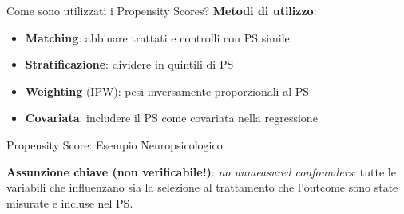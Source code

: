 \documentclass[
  ignorenonframetext,
]{beamer}
\begin{document}
\begin{frame}{Come sono utilizzati i Propensity Scores?}
\label{come-sono-utilizzati-i-propensity-scores}
\textbf{Metodi di utilizzo}:

\begin{itemize}\footnotesize
\item \textbf{Matching}: abbinare trattati e controlli con PS simile
\item \textbf{Stratificazione}: dividere in quintili di PS
\item \textbf{Weighting} (IPW): pesi inversamente proporzionali al PS
\item \textbf{Covariata}: includere il PS come covariata nella regressione
\end{itemize}
\end{frame}

\begin{frame}{Propensity Score: Esempio Neuropsicologico}
\label{propensity-score-esempio-neuropsicologico}
\begin{center}
\end{center}

\small \textbf{Assunzione chiave (non verificabile!)}:
\emph{no unmeasured confounders}: tutte le variabili che influenzano sia
la selezione al trattamento che l'outcome sono state misurate e incluse
nel PS.
\end{frame}
\end{document}
